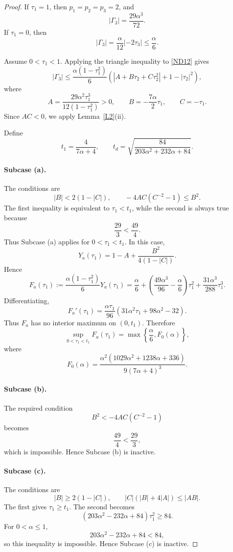 \documentclass[10pt,a4paper]{amsart}
\numberwithin{equation}{section}
\begin{document}
\begin{proof}
If $\tau_1=1$, then $p_1=p_2=p_3=2$, and
\[
|\Gamma_3|=\frac{29\alpha^3}{72}.
\]
If $\tau_1=0$, then
\[
|\Gamma_3|=\frac{\alpha}{12}|-2\tau_3|
\le \frac{\alpha}{6}.
\]

Assume $0<\tau_1<1$. Applying the triangle inequality to \eqref{ND12} gives
\begin{equation}\label{ND13}
|\Gamma_3|
\le
\frac{\alpha(1-\tau_1^2)}{6}
\left(
|A+B\tau_2+C\tau_2^2|+1-|\tau_2|^2
\right),
\end{equation}
where
\[
A=\frac{29\alpha^2\tau_1^3}{12(1-\tau_1^2)}>0,
\qquad
B=-\frac{7\alpha}{2}\tau_1,
\qquad
C=-\tau_1.
\]
Since $AC<0$, we apply Lemma~\ref{L2}(ii).

Define
\[
t_1=\frac{4}{7\alpha+4},
\qquad
t_d=\sqrt{\frac{84}{203\alpha^2+232\alpha+84}}.
\]

\paragraph{Subcase (a).}
The conditions are
\[
|B|<2(1-|C|),\qquad -4AC(C^{-2}-1)\le B^2.
\]
The first inequality is equivalent to $\tau_1<t_1$, while the second is always true because
\[
\frac{29}{3}<\frac{49}{4}.
\]
Thus Subcase (a) applies for $0<\tau_1<t_1$. In this case,
\[
Y_a(\tau_1)
=
1-A+\frac{B^2}{4(1-|C|)}.
\]
Hence
\[
F_a(\tau_1)
:=
\frac{\alpha(1-\tau_1^2)}{6}Y_a(\tau_1)
=
\frac{\alpha}{6}
+
\left(\frac{49\alpha^3}{96}-\frac{\alpha}{6}\right)\tau_1^2
+
\frac{31\alpha^3}{288}\tau_1^3.
\]
Differentiating,
\[
F_a'(\tau_1)
=
\frac{\alpha\tau_1}{96}
\left(
31\alpha^2\tau_1+98\alpha^2-32
\right).
\]
Thus $F_a$ has no interior maximum on $(0,t_1)$. Therefore
\[
\sup_{0<\tau_1<t_1} F_a(\tau_1)
=
\max\left\{
\frac{\alpha}{6},
F_0(\alpha)
\right\},
\]
where
\[
F_0(\alpha)
=
\frac{\alpha^2(1029\alpha^2+1238\alpha+336)}
{9(7\alpha+4)^3}.
\]

\paragraph{Subcase (b).}
The required condition
\[
B^2<-4AC(C^{-2}-1)
\]
becomes
\[
\frac{49}{4}<\frac{29}{3},
\]
which is impossible. Hence Subcase (b) is inactive.

\paragraph{Subcase (c).}
The conditions are
\[
|B|\ge 2(1-|C|),\qquad |C|(|B|+4|A|)\le |AB|.
\]
The first gives $\tau_1\ge t_1$. The second becomes
\[
(203\alpha^2-232\alpha+84)\tau_1^2\ge 84.
\]
For $0<\alpha\le1$,
\[
203\alpha^2-232\alpha+84<84,
\]
so this inequality is impossible. Hence Subcase (c) is inactive.


\end{proof}
\end{document}

